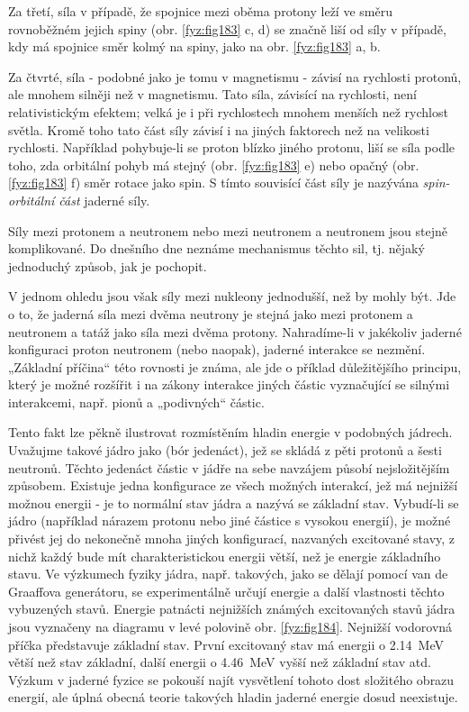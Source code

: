     Za třetí, síla v případě, že spojnice mezi oběma protony leží ve směru rovnoběžném jejich spiny
    (obr. \ref{fyz:fig183} c, d) se značně liší od síly v případě, kdy má spojnice směr kolmý na
    spiny, jako na obr. \ref{fyz:fig183} a, b.

    Za čtvrté, síla - podobné jako je tomu v magnetismu - závisí na rychlosti protonů, ale mnohem
    silněji než v magnetismu. Tato síla, závisící na rychlosti, není relativistickým efektem; velká
    je i při rychlostech mnohem menších než rychlost světla. Kromě toho tato část síly závisí i na
    jiných faktorech než na velikosti rychlosti. Například pohybuje-li se proton blízko jiného
    protonu, liší se síla podle toho, zda orbitální pohyb má stejný (obr. \ref{fyz:fig183} e) nebo
    opačný (obr. \ref{fyz:fig183} f) směr rotace jako spin. S tímto souvisící část síly je nazývána
    \emph{spin-orbitální část} jaderné síly.

    Síly mezi protonem a neutronem nebo mezi neutronem a neutronem jsou stejně komplikované. Do
    dnešního dne neznáme mechanismus těchto sil, tj. nějaký jednoduchý způsob, jak je pochopit.

    V jednom ohledu jsou však síly mezi nukleony jednodušší, než by mohly být. Jde o to, že jaderná
    síla mezi dvěma neutrony je stejná jako mezi protonem a neutronem a tatáž jako síla mezi dvěma
    protony. Nahradíme-li v jakékoliv jaderné konfiguraci proton neutronem (nebo naopak), jaderné
    interakce se nezmění. „Základní příčina“ této rovnosti je známa, ale jde o příklad důležitějšího
    principu, který je možné rozšířit i na zákony interakce jiných částic vyznačující se silnými
    interakcemi, např. pionů a „podivných“ částic.

    Tento fakt lze pěkně ilustrovat rozmístěním hladin energie v podobných jádrech. Uvažujme takové
    jádro jako  (bór jedenáct), jež se skládá z pěti protonů a šesti neutronů. Těchto
    jedenáct částic v jádře na sebe navzájem působí nejsložitějším způsobem. Existuje jedna
    konfigurace ze všech možných interakcí, jež má nejnižší možnou energii - je to normální stav
    jádra a nazývá se základní stav. Vybudí-li se jádro (například nárazem protonu nebo jiné částice
    s vysokou energií), je možné přivést jej do nekonečně mnoha jiných konfigurací, nazvaných
    excitované stavy, z nichž každý bude mít charakteristickou energii větší, než je energie
    základního stavu. Ve výzkumech fyziky jádra, např. takových, jako se dělají pomocí van de
    Graaffova generátoru, se experimentálně určují energie a další vlastnosti těchto vybuzených
    stavů. Energie patnácti nejnižších známých excitovaných stavů jádra  jsou vyznačeny na
    diagramu v levé polovině obr. \ref{fyz:fig184}. Nejnižší vodorovná příčka představuje základní
    stav. První excitovaný stav má energii o \SI{2.14}{\mega\electronvolt} větší než stav základní,
    další energii o \SI{4.46}{\mega\electronvolt} vyšší než základní stav atd. Výzkum v jaderné
    fyzice se pokouší najít vysvětlení tohoto dost složitého obrazu energií, ale úplná obecná teorie
    takových hladin jaderné energie dosud neexistuje.
    
